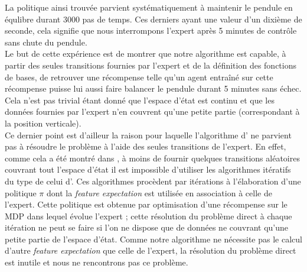 \documentclass[publibook-draft]{CAp2012}
\begin{document}
{La politique ainsi trouvée parvient systématiquement à maintenir le pendule en équlibre durant 3000 pas de temps. Ces derniers ayant une valeur d'un dixième de seconde, cela signifie que nous interrompons l'expert après 5 minutes de contrôle sans chute du pendule.\\

Le but de cette expérience est de montrer que notre algorithme est capable, à partir des seules transitions fournies par l'expert et de la définition des fonctions de bases, de retrouver une récompense telle qu'un agent entraîné sur cette récompense puisse lui aussi faire balancer le pendule durant 5 minutes sans échec. Cela n'est pas trivial étant donné que l'espace d'état est continu et que les données fournies par l'expert n'en couvrent qu'une petite partie (correspondant à la position verticale).\\

 Ce dernier point est d'ailleur la raison pour laquelle l'algorithme d'\citet{abbeel2004apprenticeship} ne parvient pas à résoudre le problème à l'aide des seules transitions de l'expert.
En effet, comme cela a été montré dans \citep{klein2011batch}, à moins de fournir quelques transitions aléatoires couvrant tout l'espace d'état il est impossible d'utiliser les algorithmes itératifs du type de celui d'\citet{abbeel2004apprenticeship}. Ces algorithmes procèdent par itérations à l'élaboration d'une politique $\pi$ dont la {\it feature expectation} est utilisée en association à celle de l'expert. Cette politique est obtenue par optimisation d'une récompense sur le MDP dans lequel évolue l'expert ; cette résolution du problème direct à chaque itération ne peut se faire si l'on ne dispose que de données ne couvrant qu'une petite partie de l'espace d'état. Comme notre algorithme ne nécessite pas le calcul d'autre {\it feature expectation} que celle de l'expert, la résolution du problème direct est inutile et nous ne rencontrons pas ce problème.
}
\end{document}
